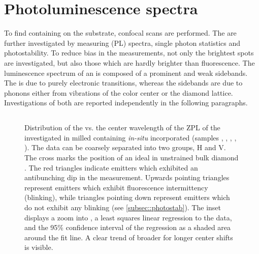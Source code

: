 


\section{Photoluminescence spectra} \label{subsec::spectra}


To find \nds containing \sivs on the substrate, confocal scans are performed.
The \sivs are further investigated by measuring \pl (PL) spectra, single photon statistics and photostability.
To reduce bias in the measurements, not only the brightest spots are investigated, but also those which are hardly brighter than \bkg fluorescence.
The luminescence spectrum of an \siv is composed of a prominent \zpl and weak sidebands.
The \ZPL is due to purely electronic transitions, whereas the sidebands are due to phonons either from vibrations of the color center or the diamond lattice.
Investigations of both are reported independently in the following paragraphs.



\subsection{\Zpl}\label{subsubsec::zpl}
	

	\begin{figure}[tp]
		\centering
		\caption{Distribution of the \lw vs. the center wavelength of the ZPL of the investigated \sivs in milled \nds containing \textit{in-situ} incorporated \sivs (samples \insituF, \insituS, \insituSn, \insituSo, \insituH{}). The data can be coarsely separated into two groups, H and V. The cross marks the position of an ideal \siv in unstrained bulk diamond \cite{Arend2016a}. The red triangles indicate emitters which exhibited an antibunching dip in the \gtz measurement. Upwards pointing triangles represent emitters which exhibit fluorescence intermittency (blinking), while triangles pointing down represent emitters which do not exhibit any blinking (see \autoref{subsec::photostab}). The inset displays a zoom into \gv, a least squares linear regression to the data, and the 95\% confidence interval of the regression as a shaded area around the fit line. A clear trend of broader \lws for longer \ZPL center shifts is visible.}
		\label{fig::bimodal_distr}
	\end{figure}



